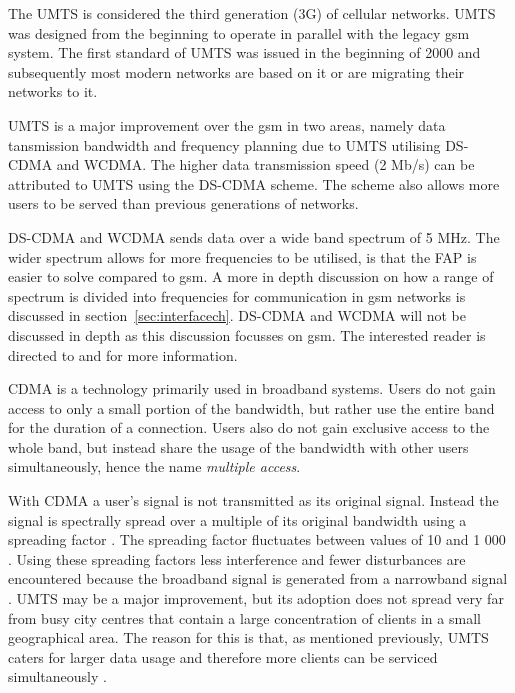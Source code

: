 The \gls{UMTS} is considered the third generation (3G) of cellular networks\cite{tabuglobalplanning3g,Eisenblatter}. \gls{UMTS} was designed from the beginning to operate in parallel with the legacy \gls{gsm} system. The first standard of \gls{UMTS} was issued in the beginning of 2000 and subsequently most modern networks are based on it or are migrating their networks to it\cite{tabuglobalplanning3g,Eisenblatter}.

UMTS is a major improvement over the \gls{gsm} in two areas, namely data tansmission bandwidth and frequency planning due to \gls{UMTS} utilising \gls{DS-CDMA} and \gls{WCDMA}\cite{tabuglobalplanning3g,Eisenblatter}. The higher data transmission speed (2 Mb/s) can be attributed to \gls{UMTS} using the \gls{DS-CDMA} scheme\cite{tabuglobalplanning3g,Eisenblatter}. The scheme also allows more users to be served than previous generations of networks\cite{tabuglobalplanning3g,Eisenblatter}. 

DS-CDMA and \gls{WCDMA} sends data over a wide band spectrum of 5 MHz. The wider spectrum allows for more frequencies to be utilised, is that the \gls{FAP} is easier to solve compared to \gls{gsm}\cite{tabuglobalplanning3g,Eisenblatter}\@. A more in depth discussion on how a range of spectrum is divided into frequencies for communication in \gls{gsm} networks is discussed in section~\ref{sec:interfacech}. \gls{DS-CDMA} and \gls{WCDMA} will not be discussed in depth as this discussion focusses on \gls{gsm}\@. The interested reader is directed to \cite{tabuglobalplanning3g} and \cite{wirelesstelcoMullet} for more information.

\Gls{CDMA} is a technology primarily used in broadband systems. Users do not gain access to only a small portion of the bandwidth, but rather use the entire band for the duration of a connection\cite{GSMArchitectureProtocolsServices}. Users also do not gain exclusive access to the whole band, but instead share the usage of the bandwidth with other users simultaneously, hence the name \emph{multiple access}\cite{GSMArchitectureProtocolsServices}.

With \gls{CDMA} a user's signal is not transmitted as its original signal. Instead the signal is spectrally spread over a multiple of its original bandwidth using a spreading factor \cite{GSMArchitectureProtocolsServices}. The spreading factor fluctuates between values of 10 and 1 000 \cite{GSMArchitectureProtocolsServices}. Using these spreading factors less interference and fewer disturbances are encountered because the broadband signal is generated from a narrowband signal \cite{GSMArchitectureProtocolsServices}.
UMTS may be a major improvement, but its adoption does not spread very far from busy city centres that contain a large concentration of clients in a small geographical area\cite{GSMArchitectureProtocolsServices}. The reason for this is that, as mentioned previously, \gls{UMTS} caters for larger data usage and therefore more clients can be serviced simultaneously \cite{GSMArchitectureProtocolsServices}.

